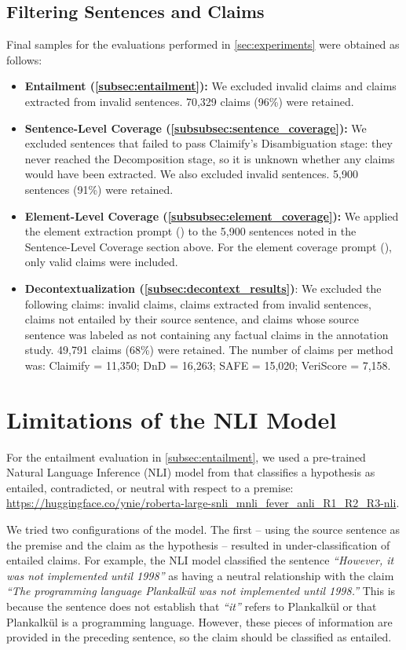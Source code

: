 \subsection{Filtering Sentences and Claims}
\label{app:filtering_statements}
Final samples for the evaluations performed in \autoref{sec:experiments} were obtained as follows:
\begin{itemize}
    \item \textbf{Entailment (\autoref{subsec:entailment}):} We excluded invalid claims and claims extracted from invalid sentences. 70,329 claims (96\%) were retained.
    \item \textbf{Sentence-Level Coverage (\autoref{subsubsec:sentence_coverage}):} We excluded sentences that failed to pass Claimify’s Disambiguation stage: they never reached the Decomposition stage, so it is unknown whether any claims would have been extracted. We also excluded invalid sentences. 5,900 sentences (91\%) were retained.
    \item \textbf{Element-Level Coverage (\autoref{subsubsec:element_coverage}):} We applied the element extraction prompt () to the 5,900 sentences noted in the Sentence-Level Coverage section above. For the element coverage prompt (), only valid claims were included.
    \item \textbf{Decontextualization (\autoref{subsec:decontext_results})}: We excluded the following claims: invalid claims, claims extracted from invalid sentences, claims not entailed by their source sentence, and claims whose source sentence was labeled as not containing any factual claims in the annotation study. 49,791 claims (68\%) were retained. The number of claims per method was: Claimify = 11,350; DnD = 16,263; SAFE = 15,020; VeriScore = 7,158.
\end{itemize}

\section{Limitations of the NLI Model}
\label{app:nli}

For the entailment evaluation in \autoref{subsec:entailment}, we used a pre-trained Natural Language Inference (NLI) model from \citet{nie:2020} that classifies a hypothesis as entailed, contradicted, or neutral with respect to a premise: \url{https://huggingface.co/ynie/roberta-large-snli_mnli_fever_anli_R1_R2_R3-nli}.

We tried two configurations of the model. The first – using the source sentence as the premise and the claim as the hypothesis – resulted in under-classification of entailed claims. For example, the NLI model classified the sentence \textit{``However, it was not implemented until 1998''} as having a neutral relationship with the claim \textit{``The programming language Plankalkül was not implemented until 1998.''} This is because the sentence does not establish that \textit{``it''} refers to Plankalkül or that Plankalkül is a programming language. However, these pieces of information are provided in the preceding sentence, so the claim should be classified as entailed.

